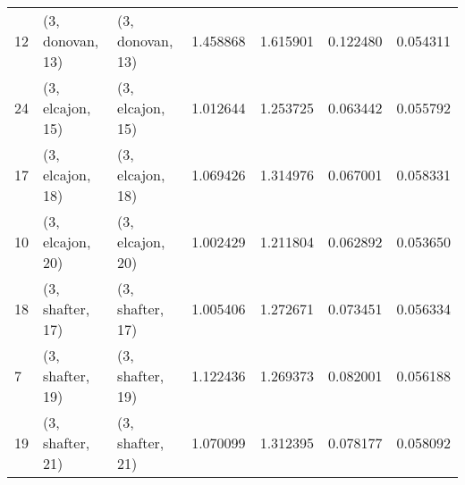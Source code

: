 \begin{tabular}{lllrrrr}
12 &  (3, donovan, 13) &  (3, donovan, 13) &  1.458868 &  1.615901 &   0.122480 &  0.054311 \\
24 &  (3, elcajon, 15) &  (3, elcajon, 15) &  1.012644 &  1.253725 &   0.063442 &  0.055792 \\
17 &  (3, elcajon, 18) &  (3, elcajon, 18) &  1.069426 &  1.314976 &   0.067001 &  0.058331 \\
10 &  (3, elcajon, 20) &  (3, elcajon, 20) &  1.002429 &  1.211804 &   0.062892 &  0.053650 \\
18 &  (3, shafter, 17) &  (3, shafter, 17) &  1.005406 &  1.272671 &   0.073451 &  0.056334 \\
7  &  (3, shafter, 19) &  (3, shafter, 19) &  1.122436 &  1.269373 &   0.082001 &  0.056188 \\
19 &  (3, shafter, 21) &  (3, shafter, 21) &  1.070099 &  1.312395 &   0.078177 &  0.058092 \\
\bottomrule
\end{tabular}

